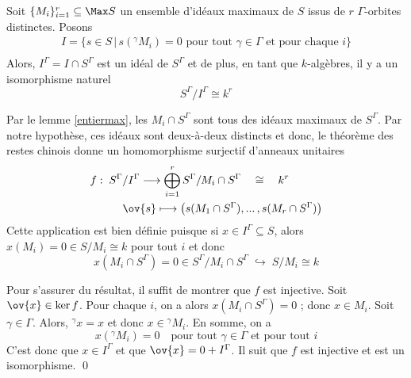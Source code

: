 \begin{Lem} \label{lemmekr} Soit $\{M_i\}_{i=1}^r \subseteq \Max S$ un ensemble d'idéaux maximaux de $S$ issus de $r$ $\Gamma$-orbites distinctes. Posons 
\begin{align*}
I = \{s \in S \, | \, s(^\gamma M_i) = 0 \text{ pour tout } \gamma \in \Gamma \text{ et pour chaque } i\} \\
\end{align*}
Alors, $I^\Gamma = I \cap S^\Gamma$ est un idéal de $S^\Gamma$ et de plus, en tant que $k$-algèbres, il y a un isomorphisme naturel 
$$ S^\Gamma / I^\Gamma \cong k^r $$
\begin{pre} Par le lemme \ref{entiermax}, les $M_i \cap S^\Gamma$ sont tous des idéaux maximaux de $S^\Gamma$. Par notre hypothèse, ces idéaux sont deux-à-deux distincts et donc, le théorème des restes chinois donne un homomorphisme surjectif d'anneaux unitaires
\begin{align*} 
f : \; S^\Gamma &/ I^\Gamma \longrightarrow \bigoplus_{i=1}^r S^\Gamma / M_i \cap S^\Gamma \quad \cong \quad k^r\\
&\ov{s} \longmapsto \big(s(M_1 \cap S^\Gamma), ... \,, s(M_r \cap S^\Gamma)\big) 
\end{align*}
Cette application est bien définie puisque si $x \in I^\Gamma \subseteq S$, alors $x(M_i) = 0 \in S/M_i \cong k$ pour tout $i$ et donc 
$$ x(M_i \cap S^\Gamma) = 0 \in S^\Gamma / M_i \cap S^\Gamma \; \hookrightarrow \; S / M_i \cong k $$

Pour s'assurer du résultat, il suffit de montrer que $f$ est injective. Soit $\ov{x} \in \ker f$. Pour chaque $i$, on a alors $x(M_i \cap S^\Gamma) = 0$ ; donc $x \in M_i$. Soit $\gamma \in \Gamma$. Alors, ${}^\gamma x = x$ et donc $x \in {}^\gamma M_i$. En somme, on a
$$ x({}^\gamma M_i) = 0 \quad \text{pour tout }\gamma \in \Gamma \text{ et pour tout } i $$ 
C'est donc que $x \in I^\Gamma$ et que $\ov{x} = 0 + I^\Gamma$. Il suit que $f$ est injective et est un isomorphisme. \qed
\end{pre}
\end{Lem}


